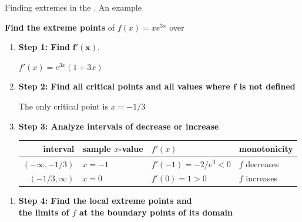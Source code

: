 \documentclass[9pt]{beamer}
\begin{document}
\begin{frame}{Finding  extremes in the . An example}

    {\hspace{0.1cm}
    \textbf{Find the  extreme points} of \href{https://www.desmos.com/calculator/1a5ijpy9x7}{$f(x) = xe^{3x}$} over \blue{$\R$}
    }
    
    \begin{enumerate}[leftmargin = 0.2cm, label = , rightmargin = 0.1cm]

        \item \textbf{Step 1: Find} $\pmb{f'(x)}$.

        $f'(x) = e^{3x}(1 + 3x)$

        \item \textbf{Step 2: Find all critical points and all values where $\pmb{f}$ is not defined}

        The only critical point is $x = -1/3$

        \item \textbf{Step 3: Analyze intervals of decrease or increase}

        \begin{table}
        \begin{flushleft}
        \begin{tabular}{r|lll}
            interval            & sample $x$-value  & $f'(x)$               & monotonicity \\ \hline
            $(-\infty, -1/3)$   & $x = -1$          & $f'(-1) = -2/e^3 < 0$ & $f$ decreases \\
            $(-1/3, \infty)$    & $x = 0$           & $f'(0) = 1 > 0$        & $f$ increases
        \end{tabular}
        \end{flushleft}
        \end{table}

    \end{enumerate}

        \begin{minipage}{0.66\textwidth}
            
            \begin{enumerate}[leftmargin = 0.2cm, label = , rightmargin = 0.1cm]
            
            \item \textbf{Step 4: Find the local extreme points and \\
            the limits of $f$ at the boundary points of its domain}
        

\end{enumerate}
\end{minipage}
\end{frame}
\end{document}
